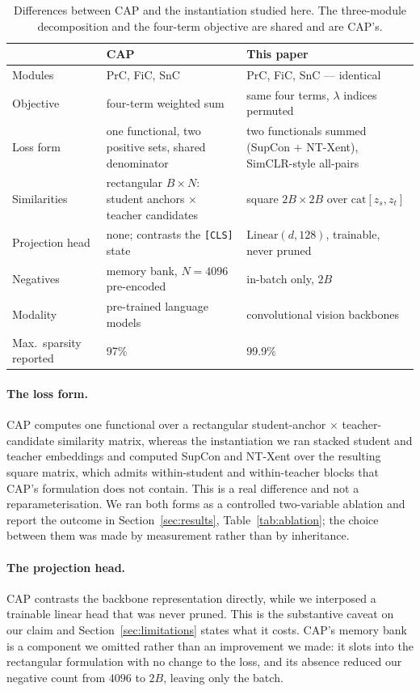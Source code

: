 \begin{table}[h]
\centering
\small
\caption{Differences between CAP \citep{xu2022cap} and the instantiation studied
here. The three-module decomposition and the four-term objective are shared and
are CAP's.}
\label{tab:cap-diff}
\begin{tabular}{@{}p{}p{}p{}@{}}
\toprule
 & CAP \citep{xu2022cap} & This paper \\
\midrule
Modules & PrC, FiC, SnC & PrC, FiC, SnC --- identical \\
Objective & four-term weighted sum & same four terms, $\lambda$ indices permuted \\
Loss form & one functional, two positive sets, shared denominator & two functionals summed (SupCon $+$ NT-Xent), SimCLR-style all-pairs \\
Similarities & rectangular $B \times N$: student anchors $\times$ teacher candidates & square $2B \times 2B$ over $\mathrm{cat}[z_s, z_t]$ \\
Projection head & none; contrasts the \texttt{[CLS]} state & $\mathrm{Linear}(d,128)$, trainable, never pruned \\
Negatives & memory bank, $N = 4096$ pre-encoded & in-batch only, $2B$ \\
Modality & pre-trained language models & convolutional vision backbones \\
Max.\ sparsity reported & 97\% & 99.9\% \\
\bottomrule
\end{tabular}
\end{table}

\paragraph{The loss form.}
CAP computes one functional over a rectangular student-anchor $\times$
teacher-candidate similarity matrix, whereas the instantiation we ran stacked
student and teacher embeddings and computed SupCon and NT-Xent over the
resulting square matrix, which admits within-student and within-teacher blocks
that CAP's formulation does not contain. This is a real difference and not a
reparameterisation. We ran both forms as a controlled two-variable ablation and
report the outcome in Section~\ref{sec:results}, Table~\ref{tab:ablation}; the
choice between them was made by measurement rather than by inheritance.

\paragraph{The projection head.}
CAP contrasts the backbone representation directly, while we interposed a
trainable linear head that was never pruned. This is the substantive caveat on
our claim and Section~\ref{sec:limitations} states what it costs. CAP's memory
bank is a component we omitted rather than an improvement we made: it slots into
the rectangular formulation with no change to the loss, and its absence reduced
our negative count from $4096$ to $2B$, leaving only the batch.

